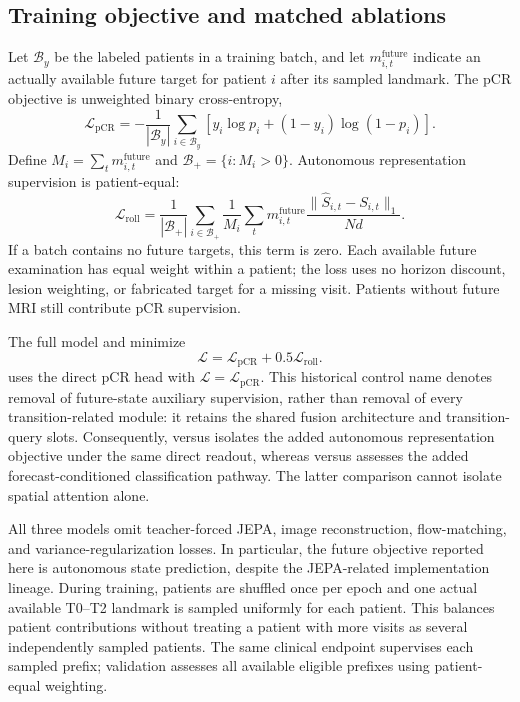 \subsection{Training objective and matched ablations}
\label{sec:objective}
Let $\mathcal{B}_{y}$ be the labeled patients in a training batch, and let $m_{i,t}^{\mathrm{future}}$ indicate an actually available future target for patient $i$ after its sampled landmark. The pCR objective is unweighted binary cross-entropy,
\begin{equation}
 \mathcal{L}_{\mathrm{pCR}}=
 -\frac{1}{|\mathcal{B}_{y}|}\sum_{i\in\mathcal{B}_{y}}
 \left[y_i\log p_i+(1-y_i)\log(1-p_i)\right].
\end{equation}
Define $M_i=\sum_t m_{i,t}^{\mathrm{future}}$ and $\mathcal{B}_{+}=\{i:M_i>0\}$. Autonomous representation supervision is patient-equal:
\begin{equation}
 \mathcal{L}_{\mathrm{roll}}=
 \frac{1}{|\mathcal{B}_{+}|}\sum_{i\in\mathcal{B}_{+}}
 \frac{1}{M_i}\sum_t m_{i,t}^{\mathrm{future}}
 \frac{\|\widehat S_{i,t}-S_{i,t}\|_1}{Nd}.
\end{equation}
If a batch contains no future targets, this term is zero. Each available future examination has equal weight within a patient; the loss uses no horizon discount, lesion weighting, or fabricated target for a missing visit. Patients without future MRI still contribute pCR supervision.

The full model and \direct{} minimize
\begin{equation}
 \mathcal{L}=\mathcal{L}_{\mathrm{pCR}}+0.5\mathcal{L}_{\mathrm{roll}}.
\end{equation}
\nojepa{} uses the direct pCR head with $\mathcal{L}=\mathcal{L}_{\mathrm{pCR}}$. This historical control name denotes removal of future-state auxiliary supervision, rather than removal of every transition-related module: it retains the shared fusion architecture and transition-query slots. Consequently, \direct{} versus \nojepa{} isolates the added autonomous representation objective under the same direct readout, whereas \fullmodel{} versus \direct{} assesses the added forecast-conditioned classification pathway. The latter comparison cannot isolate spatial attention alone.

All three models omit teacher-forced JEPA, image reconstruction, flow-matching, and variance-regularization losses. In particular, the future objective reported here is autonomous state prediction, despite the JEPA-related implementation lineage. During training, patients are shuffled once per epoch and one actual available T0--T2 landmark is sampled uniformly for each patient. This balances patient contributions without treating a patient with more visits as several independently sampled patients. The same clinical endpoint supervises each sampled prefix; validation assesses all available eligible prefixes using patient-equal weighting.
